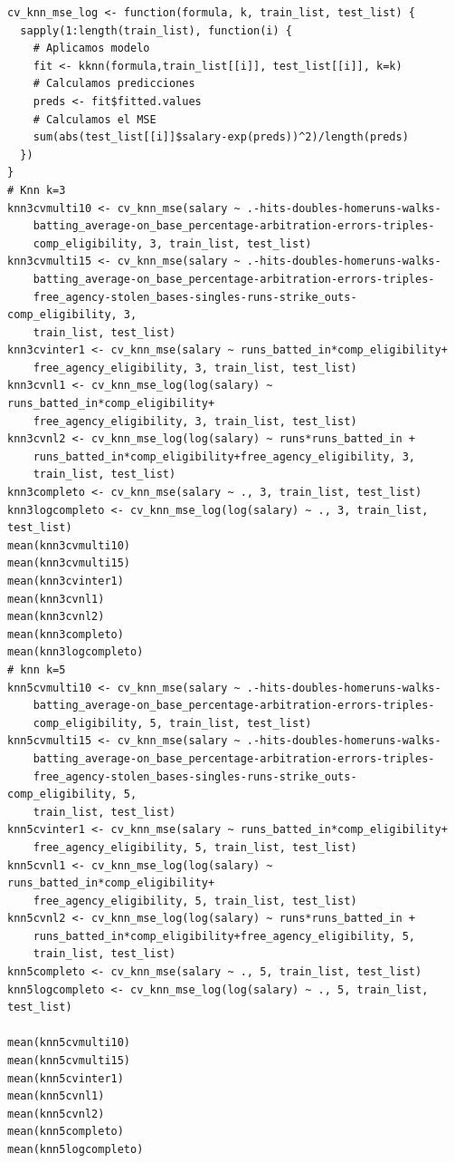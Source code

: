 \documentclass[a4paper,12pt, oneside]{book}
\begin{document}
\begin{verbatim}
cv_knn_mse_log <- function(formula, k, train_list, test_list) {
  sapply(1:length(train_list), function(i) {
    # Aplicamos modelo
    fit <- kknn(formula,train_list[[i]], test_list[[i]], k=k)
    # Calculamos predicciones
    preds <- fit$fitted.values
    # Calculamos el MSE
    sum(abs(test_list[[i]]$salary-exp(preds))^2)/length(preds)
  })
}
# Knn k=3
knn3cvmulti10 <- cv_knn_mse(salary ~ .-hits-doubles-homeruns-walks-
	batting_average-on_base_percentage-arbitration-errors-triples-
	comp_eligibility, 3, train_list, test_list)
knn3cvmulti15 <- cv_knn_mse(salary ~ .-hits-doubles-homeruns-walks-
	batting_average-on_base_percentage-arbitration-errors-triples-
	free_agency-stolen_bases-singles-runs-strike_outs-comp_eligibility, 3,
	train_list, test_list)
knn3cvinter1 <- cv_knn_mse(salary ~ runs_batted_in*comp_eligibility+
	free_agency_eligibility, 3, train_list, test_list)
knn3cvnl1 <- cv_knn_mse_log(log(salary) ~ runs_batted_in*comp_eligibility+
	free_agency_eligibility, 3, train_list, test_list)
knn3cvnl2 <- cv_knn_mse_log(log(salary) ~ runs*runs_batted_in + 
	runs_batted_in*comp_eligibility+free_agency_eligibility, 3,
	train_list, test_list)
knn3completo <- cv_knn_mse(salary ~ ., 3, train_list, test_list)
knn3logcompleto <- cv_knn_mse_log(log(salary) ~ ., 3, train_list, test_list)
mean(knn3cvmulti10)
mean(knn3cvmulti15)
mean(knn3cvinter1)
mean(knn3cvnl1)
mean(knn3cvnl2)
mean(knn3completo)
mean(knn3logcompleto)
# knn k=5
knn5cvmulti10 <- cv_knn_mse(salary ~ .-hits-doubles-homeruns-walks-
	batting_average-on_base_percentage-arbitration-errors-triples-
	comp_eligibility, 5, train_list, test_list)
knn5cvmulti15 <- cv_knn_mse(salary ~ .-hits-doubles-homeruns-walks-
	batting_average-on_base_percentage-arbitration-errors-triples-
	free_agency-stolen_bases-singles-runs-strike_outs-comp_eligibility, 5,
	train_list, test_list)
knn5cvinter1 <- cv_knn_mse(salary ~ runs_batted_in*comp_eligibility+
	free_agency_eligibility, 5, train_list, test_list)
knn5cvnl1 <- cv_knn_mse_log(log(salary) ~ runs_batted_in*comp_eligibility+
	free_agency_eligibility, 5, train_list, test_list)
knn5cvnl2 <- cv_knn_mse_log(log(salary) ~ runs*runs_batted_in + 
	runs_batted_in*comp_eligibility+free_agency_eligibility, 5,
	train_list, test_list)
knn5completo <- cv_knn_mse(salary ~ ., 5, train_list, test_list)
knn5logcompleto <- cv_knn_mse_log(log(salary) ~ ., 5, train_list, test_list)

mean(knn5cvmulti10)
mean(knn5cvmulti15)
mean(knn5cvinter1)
mean(knn5cvnl1)
mean(knn5cvnl2)
mean(knn5completo)
mean(knn5logcompleto)


\end{verbatim}
\end{document}
